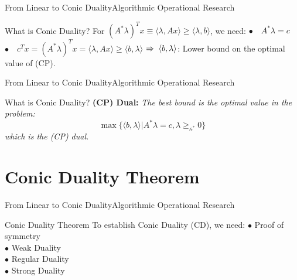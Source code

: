 \documentclass[11pt,aspectratio=169]{beamer}
\newcommand{\TT}{From Linear to Conic Duality}
\newcommand{\TL}{Algorithmic Operational Research}
\newcommand{\IN}{What is Conic Duality?}
\newcommand{\PI}{Conic Duality Theorem}
\begin{document}
\begin{frame}{\TT}{\TL}
 \begin{block}{\IN}
 \Large 
 For $(A^* \lambda)^T x \equiv \langle \lambda , Ax \rangle \geq \langle \lambda, b \rangle$, we need:\newline \newline
 $\bullet \quad A^* \lambda = c$\newline
 $\bullet \quad c^T x = (A^* \lambda)^T x = \langle \lambda,Ax\rangle \geq \langle b, \lambda \rangle$\newline \newline
 $\Rightarrow \hspace{1mm} \langle b, \lambda \rangle$: Lower bound on the optimal value of 
 (CP).\\
 \end{block}
\end{frame}

\begin{frame}{\TT}{\TL}
 \begin{block}{\IN}
 \Large
 \textbf{(CP) Dual:}
 \textit{The best bound is the optimal value in the problem:}
 $$\max\{\langle b, \lambda \rangle | A^*\lambda = c, \lambda \geq_{\kappa^*} 0 \}$$\newline
 \textit{which is the (CP) dual.}
 \end{block}
\end{frame}

\section{\PI}
\begin{frame}{\TT}{\TL}
 \begin{block}{\PI}\pause
 \Large
To establish Conic Duality (CD), we need:\newline \newline
$\bullet$ Proof of symmetry\\
$\bullet$ Weak Duality \\
$\bullet$ Regular Duality \\
$\bullet$ Strong Duality \\
 \end{block}
\end{frame}
\end{document}
